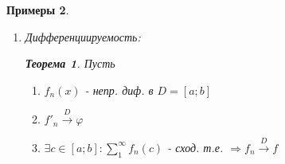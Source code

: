 \documentclass[a4paper, 12pt]{article}
\newtheorem{Examples}{Примеры}
\newtheorem{Thm}{Теорема}
\newtheorem{Note}{Замечание}
\begin{document}
\begin{Examples}
\begin{enumerate}
                \begin{Note}
                    Результат теоремы и её следствие можно усилить, 
                    если непрерывность заменить на интегрируемость.
                    (С сохранением условий равномерной сходимости)
                \end{Note}

                \newpage

                \begin{Examples}
                \leavevmode
                    \begin{enumerate}
                        \item 
                            \( \sum^{\infty}_{1} \frac{x ^ {k - 1}}{k},
                            x \in (-1; 1);
                            [-\alpha; \alpha]; 0 < \alpha < 1\)\\
                            \(\sum^{\infty}_{0} x^k\) - равн. сх-ся на
                            \( [-\alpha; \alpha] \)\\

                            \(\sum^{\infty}_{1} \frac{x ^ {k - 1}}{k} =
                            \frac{ln(1 - x)}{x} - ln(1 - x) = 
                            \int^{x}_{a} \frac{dt}{1 - t} = \int^{x}_{a} 
                            (\sum^{\infty}_{k = 0} tk) dt \underset{теорема}{=}
                            \sum^{\infty}_{k = 0} (\int^{x}_{0} t^kdt) = 
                            \sum^{\infty}_{k = 0} \left.\frac{t ^ {k + 1}}{k + 1}
                            \right|^{x}_{0} =\sum^{\infty}_{k = 0} 
                            \frac{x ^ {k + 1}}{k + 1} = \sum^{\infty}_{k = 1} 
                            \frac{x ^ k}{k} = x \cdot \sum^{\infty}_{k = 1} 
                            \frac{x^{k = 1}}{l}\) непр. в D
                    \end{enumerate}
                \end{Examples}
             \item 
                Дифференциируемость:\\

                \begin{Thm}
                    Пусть
                    \begin{enumerate}
                        \item 
                            \(f_n(x)\) - непр. диф. в \(D = [a; b]\)
                        \item
                            \( f'_n \xrightarrow{D} \varphi\)
                        \item
                        \(\exists c \in [a; b]: \sum^{\infty}_{1} f_n(c)\) - сход. т.е. \( \Rightarrow f_n \xrightarrow{D} f\)
                            

\end{enumerate}
\end{Thm}
\end{enumerate}
\end{Examples}
\end{document}
